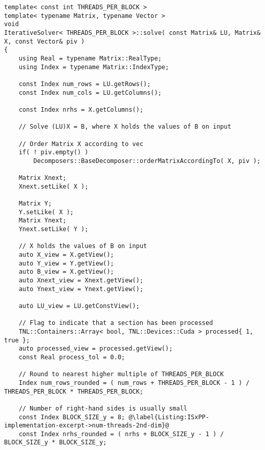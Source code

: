 \begin{lstlisting}[caption={Excerpt from the implementation of IS\_\textit{x}PP.
The code has been slightly modified for brevity, for example, the checks for appropriate sizing of matrices and vectors have been removed.
Note that the CUDA thread blocks used in the implementation are larger in the 1st dimension.
Threads adjacent in the 1st dimension are assigned to neighboring elements in the same column since the matrices are stored in column-major order on the GPU.
In other words, to mitigate misaligned global memory access, the 1st dimension of threads is used to access elements in a single column and the 2nd dimension is used to differentiate between right-hand sides.},label={Listing:ISxPP-implementation-excerpt},escapechar=@]
template< const int THREADS_PER_BLOCK >
template< typename Matrix, typename Vector >
void
IterativeSolver< THREADS_PER_BLOCK >::solve( const Matrix& LU, Matrix& X, const Vector& piv )
{
	using Real = typename Matrix::RealType;
	using Index = typename Matrix::IndexType;
	
	const Index num_rows = LU.getRows();
	const Index num_cols = LU.getColumns();
	
	const Index nrhs = X.getColumns();
	
	// Solve (LU)X = B, where X holds the values of B on input
	
	// Order Matrix X according to vec
	if( ! piv.empty() )
		Decomposers::BaseDecomposer::orderMatrixAccordingTo( X, piv );
	
	Matrix Xnext;
	Xnext.setLike( X );
	
	Matrix Y;
	Y.setLike( X );
	Matrix Ynext;
	Ynext.setLike( Y );
	
	// X holds the values of B on input
	auto X_view = X.getView();
	auto Y_view = Y.getView();
	auto B_view = X.getView();
	auto Xnext_view = Xnext.getView();
	auto Ynext_view = Ynext.getView();
	
	auto LU_view = LU.getConstView();
	
	// Flag to indicate that a section has been processed
	TNL::Containers::Array< bool, TNL::Devices::Cuda > processed{ 1, true };
	auto processed_view = processed.getView();
	const Real process_tol = 0.0;
	
	// Round to nearest higher multiple of THREADS_PER_BLOCK
	Index num_rows_rounded = ( num_rows + THREADS_PER_BLOCK - 1 ) / THREADS_PER_BLOCK * THREADS_PER_BLOCK;
	
	// Number of right-hand sides is usually small
	const Index BLOCK_SIZE_y = 8; @\label{Listing:ISxPP-implementation-excerpt->num-threads-2nd-dim}@
	const Index nrhs_rounded = ( nrhs + BLOCK_SIZE_y - 1 ) / BLOCK_SIZE_y * BLOCK_SIZE_y;
	

\end{lstlisting}

